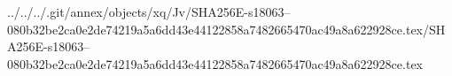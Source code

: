 ../../../.git/annex/objects/xq/Jv/SHA256E-s18063--080b32be2ca0e2de74219a5a6dd43e44122858a7482665470ac49a8a622928ce.tex/SHA256E-s18063--080b32be2ca0e2de74219a5a6dd43e44122858a7482665470ac49a8a622928ce.tex